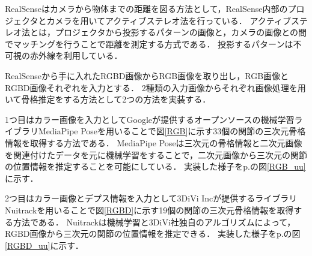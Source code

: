 \documentclass[a4j, fleqn, 12pt]{jsreport}
\begin{document}

RealSenseはカメラから物体までの距離を図る方法として，RealSense内部のプロジェクタとカメラを用いてアクティブステレオ法を行っている．
アクティブステレオ法とは，プロジェクタから投影するパターンの画像と，カメラの画像との間でマッチングを行うことで距離を測定する方式である．
投影するパターンは不可視の赤外線を利用している．

RealSenseから手に入れたRGBD画像からRGB画像を取り出し，RGB画像とRGBD画像それぞれを入力とする．
2種類の入力画像からそれぞれ画像処理を用いて骨格推定をする方法として2つの方法を実装する．

1つ目はカラー画像を入力としてGoogleが提供するオープンソースの機械学習ライブラリMediaPipe Pose\cite{mediapipe}を用いることで図\ref{RGB}に示す33個の関節の三次元骨格情報を取得する方法である．
MediaPipe Poseは三次元の骨格情報と二次元画像を関連付けたデータを元に機械学習をすることで，二次元画像から三次元の関節の位置情報を推定することを可能にしている．
実装した様子をp.\pageref{RGB_uu}の図\ref{RGB_uu}に示す．

2つ目はカラー画像とデプス情報を入力として3DiVi Incが提供するライブラリNuitrack\cite{nuitrack}を用いることで図\ref{RGBD}に示す19個の関節の三次元骨格情報を取得する方法である．
Nuitrackは機械学習と3DiVi社独自のアルゴリズムによって，RGBD画像から三次元の関節の位置情報を推定できる．
実装した様子をp.\pageref{RGBD_uu}の図\ref{RGBD_uu}に示す．
\end{document}
